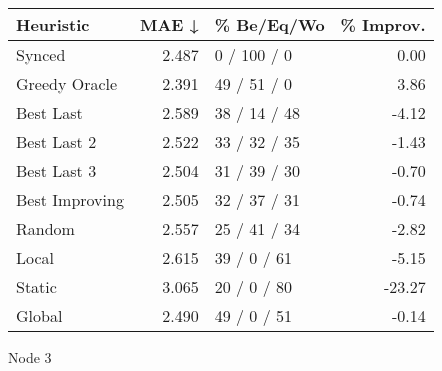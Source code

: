 \begin{tabular}{lrlr}
\toprule
\textbf{Heuristic} & \textbf{MAE ↓} & \textbf{\% Be/Eq/Wo} & \textbf{\% Improv.} \\
\midrule
            Synced &          2.487 &          0 / 100 / 0 &                0.00 \\
     Greedy Oracle &          2.391 &          49 / 51 / 0 &                3.86 \\
         Best Last &          2.589 &         38 / 14 / 48 &               -4.12 \\
       Best Last 2 &          2.522 &         33 / 32 / 35 &               -1.43 \\
       Best Last 3 &          2.504 &         31 / 39 / 30 &               -0.70 \\
    Best Improving &          2.505 &         32 / 37 / 31 &               -0.74 \\
            Random &          2.557 &         25 / 41 / 34 &               -2.82 \\
             Local &          2.615 &          39 / 0 / 61 &               -5.15 \\
            Static &          3.065 &          20 / 0 / 80 &              -23.27 \\
            Global &          2.490 &          49 / 0 / 51 &               -0.14 \\
\bottomrule
\end{tabular}
\caption{Node 3}
\label{tab:hr_iid_lr05_le2_bs2_3}
